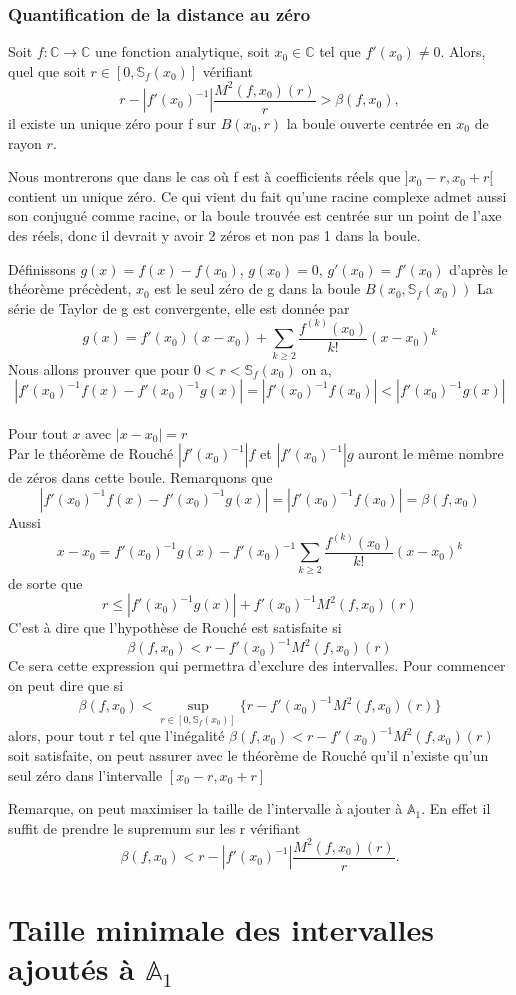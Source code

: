 \documentclass[a4paper,10.5pt]{article}
\begin{document}
	\subsubsection{Quantification de la distance au zéro}
	
	\begin{theorem} Soit $f:\mathbb{C} \rightarrow \mathbb{C}$ une fonction analytique, soit $x_0 \in \mathbb{C}$ tel que $f'(x_0) \neq 0$. Alors, quel que soit $r\in [0,\mathbb{S}_{f}(x_0)]$ vérifiant
	\[r-|f'(x_0)^{-1}|\frac{M^{2}(f,x_0)(r)}{r}>\beta(f,x_0),\]
	il existe un unique zéro pour f sur $B(x_0,r)$ la boule ouverte centrée en $x_0$ de rayon $r$. 
	\end{theorem}
	 Nous montrerons que dans le cas où f est à coefficients réels que $]x_0-r,x_0+r[$ contient un unique zéro. Ce qui vient du fait qu'une racine complexe admet aussi son conjugué comme racine, or la boule trouvée est centrée sur un point de l'axe des réels, donc il devrait y avoir 2 zéros et non pas 1 dans la boule.
	 
	 \vspace{7mm}	
	 
	
	\begin{demonstration}
	
	Définissons $g(x)=f(x)-f(x_0)$, $g(x_0)=0$, $g'(x_0)=f'(x_0)$ d'après le théorème précèdent, $x_0$ est le seul zéro de g dans la boule
	$B(x_0,\mathbb{S}_{f}(x_0))$
	La série de Taylor de g est convergente, elle est donnée par
	\[g(x)=f'(x_0)(x-x_0)+ \sum_{k \geq 2}\frac{f^{(k)}(x_0)}{k!}(x-x_0)^k\]
	Nous allons prouver que pour $0<r<\mathbb{S}_{f}(x_0)$ on a,
	\[|f'(x_0)^{-1}f(x)-f'(x_0)^{-1}g(x)|=|f'(x_0)^{-1}f(x_0)|<|f'(x_0)^{-1}g(x)|\]
	\\
	Pour tout $x$ avec $|x-x_0|=r$
	\\
	Par le théorème de Rouché $|f'(x_0)^{-1}|f$ et $|f'(x_0)^{-1}|g$ auront le même nombre de zéros dans cette boule. Remarquons que 
	\[|f'(x_0)^{-1}f(x)-f'(x_0)^{-1}g(x)|=|f'(x_0)^{-1}f(x_0)|=\beta(f,x_0)\]
	Aussi
	\[x-x_0=f'(x_0)^{-1}g(x)-f'(x_0)^{-1}\sum_{k \geq 2}\frac{f^{(k)}(x_0)}{k!}(x-x_0)^k\]
	de sorte que
	\[r \leq |f'(x_0)^{-1}g(x)|+f'(x_0)^{-1}M^{2}(f,x_0)(r) \]
	C'est à dire que l'hypothèse de Rouché est satisfaite si
	\[\beta(f,x_0)<r-f'(x_0)^{-1}M^{2}(f,x_0)(r)\] 
	Ce sera cette expression qui permettra d'exclure des intervalles. Pour commencer on peut dire que si 
	\[\beta(f,x_0)< \sup_{r \in [0,\mathbb{S}_{f}(x_0)]}\{r-f'(x_0)^{-1}M^{2}(f,x_0)(r)\}\]
	alors, pour tout r tel que l'inégalité  $\beta(f,x_0)<r-f'(x_0)^{-1}M^{2}(f,x_0)(r)$ soit satisfaite, on peut assurer avec le théorème de Rouché qu'il n'existe qu'un seul zéro dans l'intervalle $[x_0-r,x_0+r]$
	
	\end{demonstration}
	\vspace{7mm}
	\noindent Remarque, on peut maximiser la taille de l'intervalle à ajouter à $\mathbb{A}_1$. En effet il suffit de prendre le supremum sur les r vérifiant
	\[\beta(f,x_0)< r-|f'(x_0)^{-1}|\frac{M^{2}(f,x_0)(r)}{r}.\]

	
	\section{Taille minimale des intervalles ajoutés à $\mathbb{A}_1$}
	

	
	\subsection{}
	
	
\end{document}
